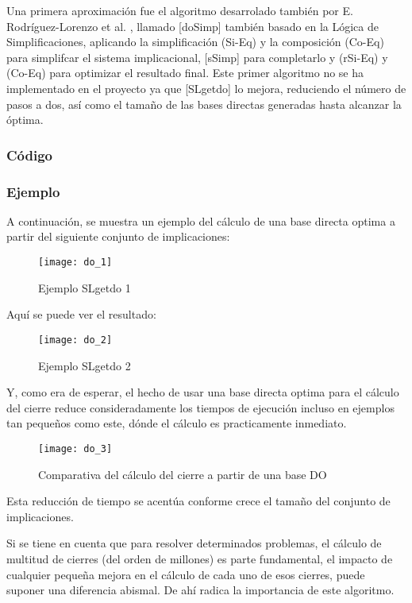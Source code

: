 Una primera aproximaci\'on  fue el algoritmo desarrolado tambi\'en por E. Rodr\'iguez-Lorenzo et al. \cite{doSimp}, llamado [doSimp] tambi\'en basado en la L\'ogica de Simplificaciones, aplicando la simplificaci\'on (Si-Eq) y la composici\'on (Co-Eq) para simplifcar el sistema implicacional, [sSimp] para completarlo y (rSi-Eq) y (Co-Eq) para optimizar el resultado final. Este primer algoritmo no se ha implementado en el proyecto ya que [SLgetdo] lo mejora, reduciendo el n\'umero de pasos a dos, as\'i como el tama\~no de las bases directas generadas hasta alcanzar la \'optima.
\subsubsection{C\'odigo} 

\newpage
\subsubsection{Ejemplo} 
A continuaci\'on, se muestra un ejemplo del c\'alculo de una base directa optima a partir del siguiente conjunto de implicaciones: 
\begin{figure}[H]
    \centering
    \texttt{[image: do\_1]}
    \caption{Ejemplo SLgetdo 1}
    \label{fig:do_1}
\end{figure} 

Aqu\'i se puede ver el resultado:
\begin{figure}[H]
    \centering
    \texttt{[image: do\_2]}
    \caption{Ejemplo SLgetdo 2}
    \label{fig:do_2}
\end{figure} 
Y, como era de esperar, el hecho de usar una base directa optima para el c\'alculo del cierre reduce consideradamente los tiempos de ejecuci\'on incluso en ejemplos tan peque\~nos como este, d\'onde el c\'alculo es practicamente inmediato.
\begin{figure}[H]
    \centering
    \texttt{[image: do\_3]}
    \caption{Comparativa del c\'alculo del cierre a partir de una base DO}
    \label{fig:do_3}
\end{figure} 

Esta reducci\'on de tiempo se acent\'ua conforme crece el tama\~no del conjunto de implicaciones.

Si se tiene en cuenta que para resolver determinados problemas, el c\'alculo de multitud de cierres (del orden de millones) es parte fundamental,\cite{Adaricheva} el impacto de cualquier peque\~na mejora en el c\'alculo de cada uno de esos cierres, puede suponer una diferencia abismal. De ah\'i radica la importancia de este algoritmo.

